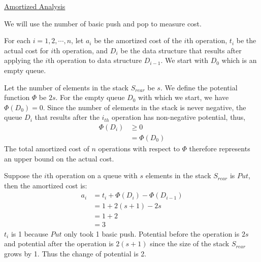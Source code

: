 \documentclass[11pt]{article}
\begin{document}
\begin{enumerate}
\underline{Amortized Analysis}

We will use the number of basic push and pop to measure cost.

For each $i=1,2,\cdots,n$, let $a_i$ be the amortized cost of the
$i$th operation, $t_i$ be the actual cost for $i$th operation, and
$D_i$ be the data structure that results after applying the $i$th
operation to data structure $D_{i-1}$. We start with $D_0$ which is an
empty queue.

Let the number of elements in the stack $S_{rear}$ be $s$. 
We define the potential function $\Phi$ be $2s$. For the empty queue
$D_0$ with which we start, we have $\Phi(D_0) = 0$. Since the number
of elements in the stack is never negative, the queue $D_i$ that
results after the $i_{th}$ operation has non-negative potential, thus,
\begin{align}
  \Phi(D_i) &\geq 0\\
  &= \Phi(D_0)
\end{align}
The total amortized cost of $n$ operations with respect to $\Phi$
therefore represents an upper bound on the actual cost. 

Suppose the $i$th operation on a queue with $s$ elements in the stack
$S_{rear}$ is $Put$, then the amortized cost is:
\begin{align}
  a_i &= t_i + \Phi(D_i) - \Phi(D_{i-1})\\
  &= 1 + 2(s+1) - 2s\\
  &= 1 + 2\\
  &= 3
\end{align}
$t_i$ is 1 because $Put$ only took 1 basic push. Potential before the
operation is $2s$ and potential after the operation is $2(s+1)$ since
the size of the stack $S_{rear}$ grows by 1. Thus the change of
potential is 2.


\end{enumerate}
\end{document}
